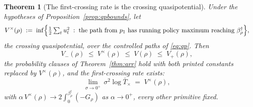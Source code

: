 \documentclass[11pt]{article}
\newtheorem{theorem}{Theorem}[section]
\theoremstyle{definition}
\theoremstyle{remark}
\numberwithin{equation}{section}
\begin{document}
\begin{theorem}[The first-crossing rate is the crossing quasipotential]\label{thm:rate}
Under the hypotheses of Proposition~\ref{prop:qpbounds}, let
\begin{equation}\label{eq:qpx}
V^{\times}(\rho) \;:=\; \inf\Bigl\{\tfrac12\textstyle\sum_t u_t^2 \;:\; \text{the path from $p_1$ has running policy maximum reaching $\beta^\dagger_\rho$}\Bigr\},
\end{equation}
the crossing quasipotential, over the controlled paths of \eqref{eq:qp}. Then
\[
V_-(\rho) \;\le\; V^{\times}(\rho) \;\le\; V(\rho) \;\le\; V_+(\rho),
\]
the probability clauses of Theorem~\ref{thm:arr} hold with both printed constants replaced by $V^{\times}(\rho)$, and the first-crossing rate exists:
\[
\lim_{\sigma\to0^+}\, \sigma^2 \log \bar T_{\times} \;=\; V^{\times}(\rho),
\]
with $\alpha\,V^{\times}(\rho) \to 2\int_0^{\beta^\dagger_\rho}(-G_\rho)$ as $\alpha \to 0^+$, every other primitive fixed.
\end{theorem}
\end{document}
